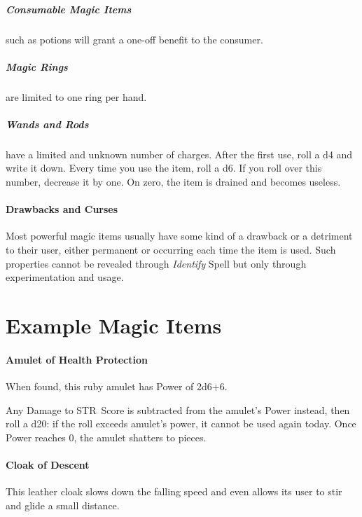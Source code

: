 \documentclass[itdr/core]{subfiles}
\begin{document}
\vfill

\subparagraph{Consumable Magic Items} such as potions will grant a one-off benefit to the consumer.

\vfill

\subparagraph{Magic Rings} are limited to one ring per hand.

\vfill

\subparagraph{Wands and Rods} have a limited and unknown number of charges. After the first use, roll a d4 and write it down. Every time you use the item, roll a d6. If you roll over this number, decrease it by one. On zero, the item is drained and becomes useless.

\vfill

\paragraph{Drawbacks and Curses}
Most powerful magic items usually have some kind of a drawback or a detriment to their user, either \mbox{permanent} or occurring each time the item is used. Such properties cannot be revealed through \textit{Identify} Spell but only through experimentation and usage.

\vfill
{}
\vfill
\break


\section{Example Magic Items}

\paragraph{Amulet of Health Protection}
When found, this ruby amulet has Power of 2d6+6.

Any Damage to STR~Score is subtracted from the amulet's Power instead, then roll a d20: if the roll exceeds amulet's power, it cannot be used again today. Once Power reaches 0, the amulet shatters to pieces.

\vfill
\paragraph{Cloak of Descent}
This leather cloak slows down the falling speed and even allows its user to stir and glide a small distance.
\end{document}
